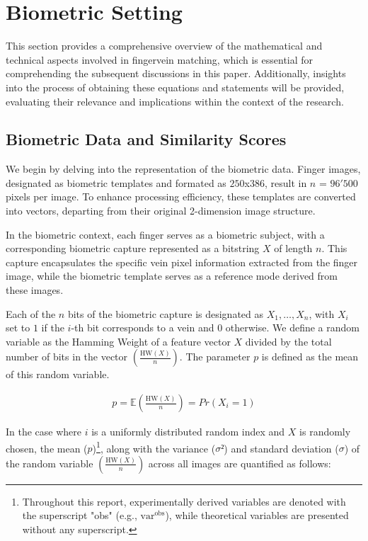 
\section{Biometric Setting}
\label{sec:bio_setting}
This section provides a comprehensive overview of the mathematical and technical aspects involved in fingervein matching, which is essential for comprehending the subsequent discussions in this paper. Additionally, insights into the process of obtaining these equations and statements will be provided, evaluating their relevance and implications within the context of the research. 

\subsection{Biometric Data and Similarity Scores}
\label{Bio_data_sim_scores}
We begin by delving into the representation of the biometric data. Finger images, designated as biometric templates and formated as \(250\)x\(386\), result in \(n\) = \(96'500\) pixels per image. To enhance processing efficiency, these templates are converted into vectors, departing from their original 2-dimension image structure. 

In the biometric context, each finger serves as a biometric subject, with a corresponding biometric capture represented as a bitstring \(X\) of length \(n\). This capture encapsulates the specific vein pixel information extracted from the finger image, while the biometric template serves as a reference mode derived from these images. 

Each of the \(n\) bits of the biometric capture is designated as \(X_1, \ldots, X_n\), with \(X_i\) set to \(1\) if the \(i\)-th bit corresponds to a vein and \(0\) otherwise. We define a random variable as the Hamming Weight of a feature vector \(X\) divided by the total number of bits in the vector \(\left( \frac{\text{HW}(X)}{n} \right)\). The parameter \(p\) is defined as the mean of this random variable.

\begin{equation} \label{eq:p}
    \begin{aligned}
        p = \mathbb{E}\left( \frac{\text{HW}(X)}{n} \right) = Pr\left(X_i = 1\right)
    \end{aligned}
\end{equation}

In the case where \(i\) is a uniformly distributed random index and \(X\) is randomly chosen, the mean (\(p\))\footnote{Throughout this report, experimentally derived variables are denoted with the superscript "obs" (e.g., \(\text{var}^{\text{obs}}\)), while theoretical variables are presented without any superscript.}, along with the variance (\(\sigma²\)) and standard deviation (\(\sigma\)) of the random variable \(\left( \frac{\text{HW}(X)}{n} \right)\) across all images are quantified as follows:

